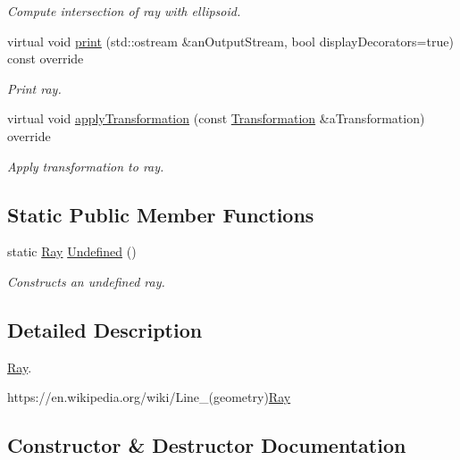 \begin{DoxyCompactItemize}
\begin{DoxyCompactList}\small\item\em Compute intersection of ray with ellipsoid. \end{DoxyCompactList}\item 
virtual void \hyperlink{classostk_1_1math_1_1geom_1_1d3_1_1objects_1_1_ray_af2aed02d301de6d224cc757b7db573a7}{print} (std\+::ostream \&an\+Output\+Stream, bool display\+Decorators=true) const override
\begin{DoxyCompactList}\small\item\em Print ray. \end{DoxyCompactList}\item 
virtual void \hyperlink{classostk_1_1math_1_1geom_1_1d3_1_1objects_1_1_ray_abdbc52aa6745f9d9601a8138a519d828}{apply\+Transformation} (const \hyperlink{classostk_1_1math_1_1geom_1_1d3_1_1_transformation}{Transformation} \&a\+Transformation) override
\begin{DoxyCompactList}\small\item\em Apply transformation to ray. \end{DoxyCompactList}\end{DoxyCompactItemize}
\subsection*{Static Public Member Functions}
\begin{DoxyCompactItemize}
\item 
static \hyperlink{classostk_1_1math_1_1geom_1_1d3_1_1objects_1_1_ray}{Ray} \hyperlink{classostk_1_1math_1_1geom_1_1d3_1_1objects_1_1_ray_a858510b6478f7cb47b763df6c641dfa7}{Undefined} ()
\begin{DoxyCompactList}\small\item\em Constructs an undefined ray. \end{DoxyCompactList}\end{DoxyCompactItemize}


\subsection{Detailed Description}
\hyperlink{classostk_1_1math_1_1geom_1_1d3_1_1objects_1_1_ray}{Ray}. 

https\+://en.wikipedia.\+org/wiki/\+Line\+\_\+(geometry)\hyperlink{classostk_1_1math_1_1geom_1_1d3_1_1objects_1_1_ray_a78335698f8a4f72e613e607b13121df0}{Ray} 

\subsection{Constructor \& Destructor Documentation}
\mbox{\label{classostk_1_1math_1_1geom_1_1d3_1_1objects_1_1_ray_a78335698f8a4f72e613e607b13121df0}} 
